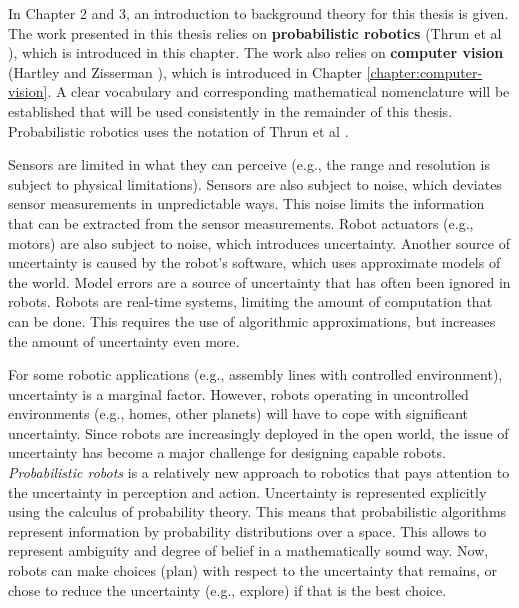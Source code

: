 In Chapter 2 and 3, an introduction to background theory for this thesis is given.
The work presented in this thesis relies on \textbf{probabilistic robotics} (Thrun et al \cite{fox2005probabilistic}), which is introduced in this chapter.
The work also relies on \textbf{computer vision} (Hartley and Zisserman \cite{Hartley2004}), which is introduced in Chapter \ref{chapter:computer-vision}.
A clear vocabulary and corresponding mathematical nomenclature will be established that will be used consistently in the remainder of this thesis.
Probabilistic robotics uses the notation of Thrun et al \cite{fox2005probabilistic}.

Sensors are limited in what they can perceive (e.g., the range and resolution is subject to physical limitations).
Sensors are also subject to noise, which deviates sensor measurements in unpredictable ways.
This noise limits the information that can be extracted from the sensor measurements.
Robot actuators (e.g., motors) are also subject to noise, which introduces uncertainty.
Another source of uncertainty is caused by the robot's software, which uses approximate models of the world.
Model errors are a source of uncertainty that has often been ignored in robots.
Robots are real-time systems, limiting the amount of computation that can be done.
This requires the use of algorithmic approximations, but increases the amount of uncertainty even more.

For some robotic applications (e.g., assembly lines with controlled environment), uncertainty is a marginal factor.
However, robots operating in uncontrolled environments (e.g., homes, other planets) will have to cope with significant uncertainty.
Since robots are increasingly deployed in the open world, the issue of uncertainty has become a major challenge for designing capable robots.
\textit{Probabilistic robots} is a relatively new approach to robotics that pays attention to the uncertainty in perception and action.
Uncertainty is represented explicitly using the calculus of probability theory.
This means that probabilistic algorithms represent information by probability distributions over a space.
This allows to represent ambiguity and degree of belief in a mathematically sound way.
Now, robots can make choices (plan) with respect to the uncertainty that remains, or chose to reduce the uncertainty (e.g., explore) if that is the best choice.

